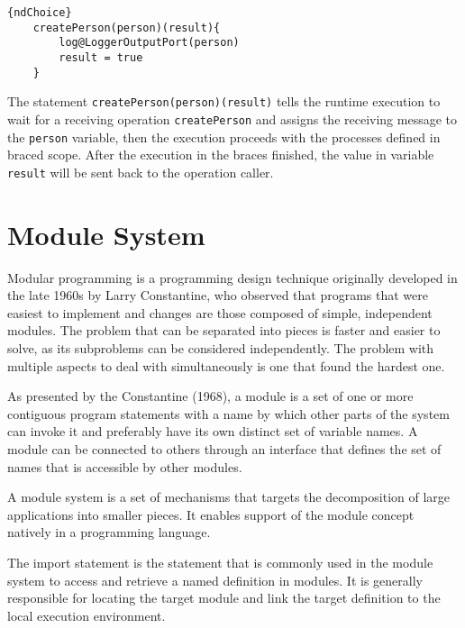 \begin{lstlisting}{ndChoice}
    createPerson(person)(result){
        log@LoggerOutputPort(person)
        result = true
    }
\end{lstlisting}

The statement \texttt{createPerson(person)(result)} tells the runtime execution to wait for a receiving operation \texttt{createPerson} and assigns the receiving message to the \texttt{person} variable, then the execution proceeds with the processes defined in braced scope. After the execution in the braces finished, the value in variable \texttt{result} will be sent back to the operation caller.








\section{Module System}

Modular programming is a programming design technique originally developed in the late 1960s by Larry Constantine, who observed that programs that were easiest to implement and changes are those composed of simple, independent modules\cite{Stevens-1999}. The problem that can be separated into pieces is faster and easier to solve, as its subproblems can be considered independently. The problem with multiple aspects to deal with simultaneously is one that found the hardest one.

As presented by the Constantine (1968)\cite{Stevens-1999}, a module is a set of one or more contiguous program statements with a name by which other parts of the system can invoke it and preferably have its own distinct set of variable names. A module can be connected to others through an interface that defines the set of names that is accessible by other modules.

A module system is a set of mechanisms that targets the decomposition of large applications into smaller pieces. It enables support of the module concept natively in a programming language. 

The import statement is the statement that is commonly used in the module system to access and retrieve a named definition in modules. It is generally responsible for locating the target module and link the target definition to the local execution environment.

